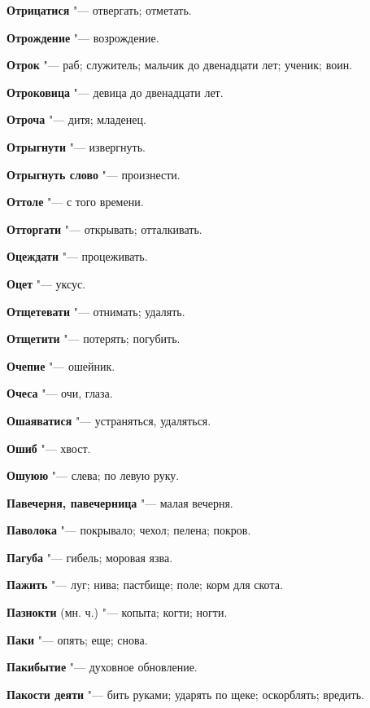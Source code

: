 \begin{mymulticols}
\noindent\textbf{Отрицатися} "--- отвергать; отметать. 

\noindent\textbf{Отрождение} "--- возрождение. 

\noindent\textbf{Отрок} "--- раб; служитель; мальчик до двенадцати лет; ученик; воин. 

\noindent\textbf{Отроковица} "--- девица до двенадцати лет. 

\noindent\textbf{Отроча} "--- дитя; младенец. 

\noindent\textbf{Отрыгнути} "--- извергнуть. 

\noindent\textbf{Отрыгнуть слово} "--- произнести. 

\noindent\textbf{Оттоле} "--- с того времени. 

\noindent\textbf{Отторгати} "--- открывать; отталкивать. 

\noindent\textbf{Оцеждати} "--- процеживать. 

\noindent\textbf{Оцет} "--- уксус. 

\noindent\textbf{Отщетевати} "--- отнимать; удалять. 

\noindent\textbf{Отщетити} "--- потерять; погубить. 

\noindent\textbf{Очепие} "--- ошейник. 

\noindent\textbf{Очеса} "--- очи, глаза. 

\noindent\textbf{Ошаяватися} "--- устраняться, удаляться. 

\noindent\textbf{Ошиб} "--- хвост. 

\noindent\textbf{Ошуюю} "--- слева; по левую руку. 

\bukvaending


\noindent\textbf{Павечерня, павечерница} "--- малая вечерня. 

\noindent\textbf{Паволока} "--- покрывало; чехол; пелена; покров. 

\noindent\textbf{Пагуба} "--- гибель; моровая язва. 

\noindent\textbf{Пажить} "--- луг; нива; пастбище; поле; корм для скота. 

\noindent\textbf{Пазнокти} (мн. ч.) "--- копыта; когти; ногти. 

\noindent\textbf{Паки} "--- опять; еще; снова. 

\noindent\textbf{Пакибытие} "--- духовное обновление. 

\noindent\textbf{Пакости деяти} "--- бить руками; ударять по щеке; оскорблять; вредить. 


\end{mymulticols}
